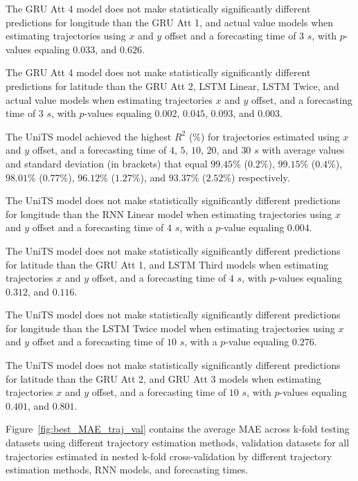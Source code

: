 The GRU Att 4 model does not make statistically significantly different predictions for longitude than the GRU Att 1, and actual value models when estimating trajectories using $x$ and $y$ offset and a forecasting time of $3$ $s$, with $p$-values equaling $0.033$, and $0.626$.

The GRU Att 4 model does not make statistically significantly different predictions for latitude than the GRU Att 2, LSTM Linear, LSTM Twice, and actual value models when estimating trajectories $x$ and $y$ offset, and a forecasting time of $3$ $s$, with $p$-values equaling $0.002$, $0.045$, $0.093$, and $0.003$.

The UniTS model achieved the highest $R^{2}$ (\%) for trajectories estimated using $x$ and $y$ offset, and a forecasting time of $4$, $5$, $10$, $20$, and $30$ $s$ with average values and standard deviation (in brackets) that equal $99.45$\% ($0.2$\%), $99.15$\% ($0.4$\%), $98.01$\% ($0.77$\%), $96.12$\% ($1.27$\%), and $93.37$\% ($2.52$\%) respectively.

The UniTS model does not make statistically significantly different predictions for longitude than the RNN Linear model when estimating trajectories using $x$ and $y$ offset and a forecasting time of $4$ $s$, with a $p$-value equaling $0.004$.

The UniTS model does not make statistically significantly different predictions for latitude than the GRU Att 1, and LSTM Third models when estimating trajectories $x$ and $y$ offset, and a forecasting time of $4$ $s$, with $p$-values equaling $0.312$, and $0.116$.

The UniTS model does not make statistically significantly different predictions for longitude than the LSTM Twice model when estimating trajectories using $x$ and $y$ offset and a forecasting time of $10$ $s$, with a $p$-value equaling $0.276$.

The UniTS model does not make statistically significantly different predictions for latitude than the GRU Att 2, and GRU Att 3 models when estimating trajectories $x$ and $y$ offset, and a forecasting time of $10$ $s$, with $p$-values equaling $0.401$, and $0.801$.

Figure~\ref{fig:best_MAE_traj_val} contains the average MAE across k-fold testing datasets using different trajectory estimation methods, validation datasets for all trajectories estimated in nested k-fold cross-validation by different trajectory estimation methods, RNN models, and forecasting times.

